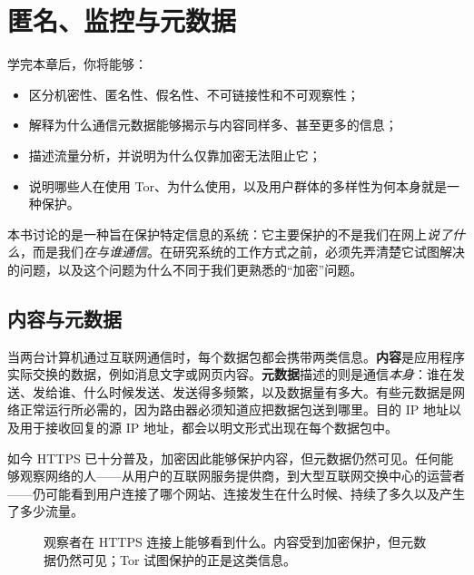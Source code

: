 \chapter{匿名、监控与元数据}\label{cap:01-anonimato}

\begin{obiettivi}
学完本章后，你将能够：
\begin{itemize}[nosep]
  \item 区分机密性、匿名性、假名性、不可链接性和不可观察性；
  \item 解释为什么通信元数据能够揭示与内容同样多、甚至更多的信息；
  \item 描述流量分析，并说明为什么仅靠加密无法阻止它；
  \item 说明哪些人在使用 Tor、为什么使用，以及用户群体的多样性为何本身就是一种保护。
\end{itemize}
\end{obiettivi}

本书讨论的是一种旨在保护特定信息的系统：它主要保护的不是我们在网上\emph{说了什么}，而是我们\emph{在与谁通信}。在研究系统的工作方式之前，必须先弄清楚它试图解决的问题，以及这个问题为什么不同于我们更熟悉的“加密”问题。

\section{内容与元数据}\label{sec:anon-metadati}

当两台计算机通过互联网通信时，每个数据包都会携带两类信息。\textbf{内容}是应用程序实际交换的数据，例如消息文字或网页内容。\textbf{元数据}描述的则是通信\emph{本身}：谁在发送、发给谁、什么时候发送、发送得多频繁，以及数据量有多大。有些元数据是网络正常运行所必需的，因为路由器必须知道应把数据包送到哪里。目的 IP 地址以及用于接收回复的源 IP 地址，都会以明文形式出现在每个数据包中。

如今 HTTPS 已十分普及，加密因此能够保护内容，但元数据仍然可见。任何能够观察网络的人——从用户的互联网服务提供商，到大型互联网交换中心的运营者——仍可能看到用户连接了哪个网站、连接发生在什么时候、持续了多久以及产生了多少流量。

\begin{figure}[htbp]
\centering

\caption{观察者在 HTTPS 连接上能够看到什么。内容受到加密保护，但元数据仍然可见；Tor 试图保护的正是这类信息。}
\label{fig:metadati}
\end{figure}

